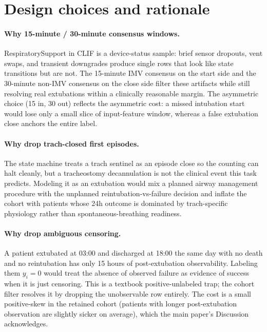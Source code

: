 \documentclass[11pt]{article}
\begin{document}
\section{Design choices and rationale}
\label{sec:rationale}

\paragraph{Why 15-minute / 30-minute consensus windows.}
RespiratorySupport in CLIF is a device-status sample: brief sensor
dropouts, vent swaps, and transient downgrades produce single rows
that look like state transitions but are not. The 15-minute IMV
consensus on the start side and the 30-minute non-IMV consensus on the
close side filter these artifacts while still resolving real
extubations within a clinically reasonable margin. The asymmetric
choice (15 in, 30 out) reflects the asymmetric cost: a missed
intubation start would lose only a small slice of input-feature
window, whereas a false extubation close anchors the entire label.

\paragraph{Why drop trach-closed first episodes.}
The state machine treats a trach sentinel as an episode close so the
counting can halt cleanly, but a tracheostomy decannulation is not the
clinical event this task predicts. Modeling it as an extubation would
mix a planned airway management procedure with the unplanned
reintubation-vs-failure decision and inflate the cohort with patients
whose 24h outcome is dominated by trach-specific physiology rather
than spontaneous-breathing readiness.

\paragraph{Why drop ambiguous censoring.}
A patient extubated at 03:00 and discharged at 18:00 the same day with
no death and no reintubation has only 15 hours of post-extubation
observability. Labeling them $y_i = 0$ would treat the absence of
observed failure as evidence of success when it is just censoring.
This is a textbook positive-unlabeled trap; the cohort filter resolves
it by dropping the unobservable row entirely. The cost is a small
positive-skew in the retained cohort (patients with longer
post-extubation observation are slightly sicker on average), which the
main paper's Discussion acknowledges.
\end{document}
